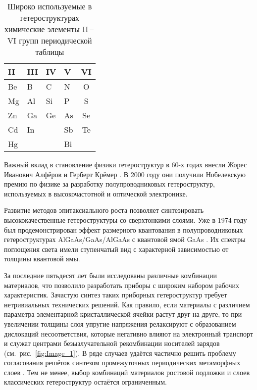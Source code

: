 \begin{table} [htbp] \centering \begin{threeparttable}%
	\caption{Широко используемые в гетероструктурах химические элементы II\,--\,VI групп периодической таблицы}\label{tab:tab1}%
	\begin{tabular}{ p{3cm}  p{3cm}  p{3cm}  p{3cm}  c }
		\hline
		\hline II & III & IV  & V & VI
		\\
		\hline
		  Be & B  & C  & N   & O    \\
		  Mg & Al & Si & P   & S    \\
		  Zn & Ga & Ge & As  & Se   \\
		  Cd & In &    & Sb  & Te   \\
		  Hg &    &    & Bi	 &      \\
	    \hline
	    \hline
	     \end{tabular}
      \end{threeparttable}
   \end{table}

Важный вклад в становление физики гетероструктур в 60-х годах внесли Жорес
Иванович Алфёров \cite{Alferov2001} и Герберт Крёмер \cite{Kroemer1957}. В 2000
году они получили Нобелевскую премию по физике за разработку полупроводниковых
гетероструктур, используемых в высокочастотной и оптической электронике.

Развитие методов эпитаксиального роста позволяет синтезировать
высококачественные гетероструктуры со сверхтонкими слоями. Уже в 1974 году был
продемонстрирован эффект размерного квантования в полупроводниковых
гетероструктурах AlGaAs/GaAs/AlGaAs с квантовой ямой GaAs \cite{Dingle1974}. Их
спектры поглощения света имели ступенчатый вид с характерной зависимостью от
толщины квантовой ямы.

За последние пятьдесят лет были исследованы различные комбинации материалов,
что позволило разработать приборы с широким набором рабочих характеристик.
Зачастую синтез таких приборных гетероструктур требует нетривиальных
технических решений. Как правило, если материалы с различием параметра
элементарной кристаллической ячейки растут друг на друге, то при увеличении
толщины слоя упругие напряжения релаксируют с образованием дислокаций
несоответствия, которые негативно влияют на электронный транспорт и служат
центрами безызлучательной рекомбинации носителей зарядов
(см.~рис.~\cref{fig:Image_1}). В ряде случаев удаётся частично решить проблему
согласования решёток синтезом промежуточных периодических метаморфных слоев
\cite{Bolshakov2019}. Тем не менее, выбор комбинаций материалов ростовой
подложки и слоев классических гетероструктур остаётся ограниченным.

